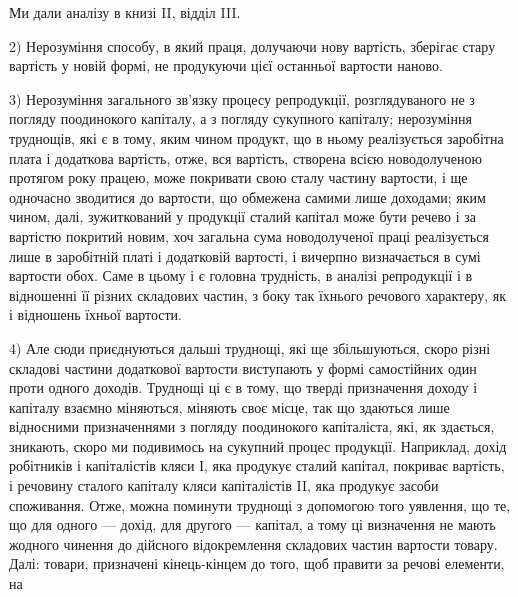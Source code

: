 Ми дали аналізу в книзі II, відділ III.

2) Нерозуміння способу, в який праця, долучаючи нову вартість, зберігає
стару вартість у новій формі, не продукуючи цієї останньої вартости наново.

3) Нерозуміння загального зв’язку процесу репродукції, розглядуваного не
з погляду поодинокого капіталу, а з погляду сукупного капіталу; нерозуміння
труднощів, які є в тому, яким чином продукт, що в ньому реалізується заробітна
плата і додаткова вартість, отже, вся вартість, створена всією новодолученою
протягом року працею, може покривати свою сталу частину вартости, і ще одночасно
зводитися до вартости, що обмежена самими лише доходами; яким чином,
далі, зужиткований у продукції сталий капітал може бути речево і за
вартістю покритий новим, хоч загальна сума новодолученої праці реалізується
лише в заробітній платі і додатковій вартості, і вичерпно визначається в сумі
вартости обох. Саме в цьому і є головна трудність, в аналізі репродукції і в відношенні
її різних складових частин, з боку так їхнього речового характеру, як
і відношень їхньої вартости.

4) Але сюди приєднуються дальші труднощі, які ще збільшуються, скоро
різні складові частини додаткової вартости виступають у формі самостійних один
проти одного доходів. Труднощі ці є в тому, що тверді призначення доходу і
капіталу взаємно міняються, міняють своє місце, так що здаються лише відносними
призначеннями з погляду поодинокого капіталіста, які, як здається, зникають,
скоро ми подивимось на сукупний процес продукції. Наприклад, дохід
робітників і капіталістів кляси І, яка продукує сталий капітал, покриває вартість,
і речовину сталого капіталу кляси капіталістів II, яка продукує засоби споживання.
Отже, можна поминути труднощі з допомогою того уявлення, що те, що
для одного — дохід, для другого — капітал, а тому ці визначення не мають жодного
чинення до дійсного відокремлення складових частин вартости товару. Далі:
товари, призначені кінець-кінцем до того, щоб правити за речові елементи, на